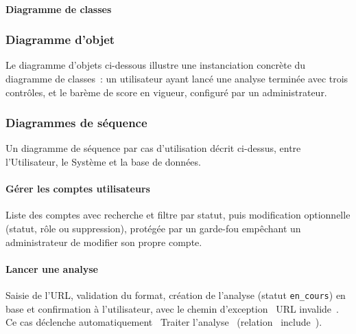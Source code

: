 \paragraph{Diagramme de classes}


\subsubsection{Diagramme d'objet}

Le diagramme d'objets ci-dessous illustre une instanciation concr\`ete du
diagramme de classes~: un utilisateur ayant lanc\'e une analyse termin\'ee avec
trois contr\^oles, et le bar\`eme de score en vigueur, configur\'e par un
administrateur.


\subsubsection{Diagrammes de s\'equence}

Un diagramme de s\'equence par cas d'utilisation d\'ecrit ci-dessus, entre
l'Utilisateur, le Syst\`eme et la base de donn\'ees.

\paragraph{G\'erer les comptes utilisateurs}

Liste des comptes avec recherche et filtre par statut, puis modification
optionnelle (statut, r\^ole ou suppression), prot\'eg\'ee par un garde-fou
emp\^echant un administrateur de modifier son propre compte.


\paragraph{Lancer une analyse}

Saisie de l'URL, validation du format, cr\'eation de l'analyse (statut
\texttt{en\_cours}) en base et confirmation \`a l'utilisateur, avec le chemin
d'exception \og~URL invalide~\fg. Ce cas d\'eclenche automatiquement \og~Traiter
l'analyse~\fg{} (relation \og~include~\fg).

